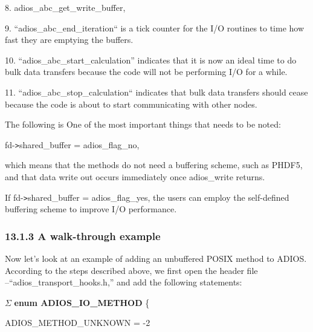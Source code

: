 \vspace{10pt}
8. adios\_abc\_get\_write\_buffer,

\vspace{10pt}
9. ``adios\_abc\_end\_iteration`` is {\color{color01} a tick counter for the I/O 
routines to time how fast they are emptying the buffers.} 

\vspace{10pt}
10. ``adios\_abc\_start\_calculation'' {\color{color01} indicates that it is now 
an ideal time to do bulk data transfers because the code will not be performing 
I/O for a while.}

\vspace{10pt}
11. ``adios\_abc\_stop\_calculation`` indicates {\color{color01} that bulk data 
transfers should cease because the code is about to start communicating with other 
nodes.}

\vspace{10pt}
The following is One of the most important things that needs to be noted: 

\vspace{10pt}
fd-\texttt{>}shared\_buffer = adios\_flag\_no,

\vspace{10pt}
which means that the methods do not need a buffering scheme, such as PHDF5, and 
that data write out occurs immediately once adios\_write returns.

\vspace{10pt}
If fd-\texttt{>}shared\_buffer = adios\_flag\_yes, the users can employ the self-defined 
buffering scheme to improve I/O performance.\label{HToc84890314}\label{HToc212016689}\label{HToc212016931}\label{HToc182553456}

\vspace{10pt}
\subsubsection*{{\large \textbf{13.1.3 A walk-through example}}}

\vspace{10pt}
Now let's look at an example of adding an unbuffered POSIX method to ADIOS.  According 
to the steps described above, we first open the header file --``adios\_transport\_hooks.h,'' 
and add the following statements:

\vspace{10pt}
\ensuremath{\Sigma} \textbf{enum ADIOS\_IO\_METHOD} \{

\vspace{10pt}
\parindent=79pt
ADIOS\_METHOD\_UNKNOWN     = -2

